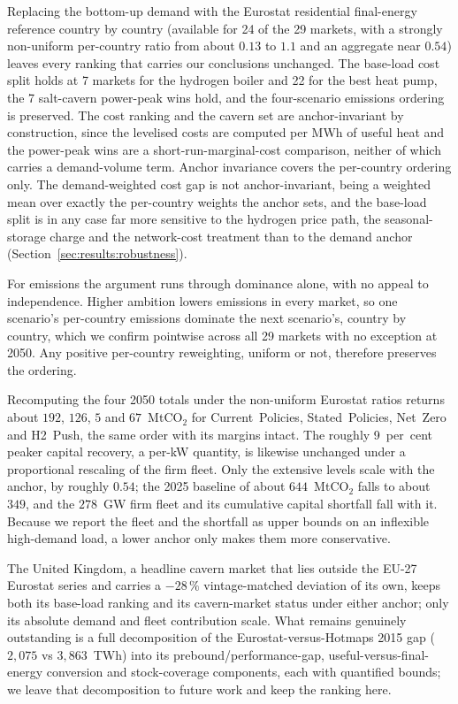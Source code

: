 Replacing the bottom-up demand with the Eurostat
residential final-energy reference country by country (available for 24 of the 29
markets, with a strongly non-uniform per-country ratio from about $0.13$ to $1.1$ and
an aggregate near $0.54$) leaves every ranking that carries our conclusions unchanged. The base-load cost split holds at 7 markets for the hydrogen boiler and 22 for the
best heat pump, the
7 salt-cavern power-peak wins hold, and the four-scenario emissions ordering is
preserved. The cost ranking and the cavern set are anchor-invariant by construction, since the levelised costs are computed per MWh of useful heat
and the power-peak wins are a short-run-marginal-cost comparison, neither of which
carries a demand-volume term. Anchor invariance covers the per-country ordering only.
The demand-weighted cost gap is not anchor-invariant, being a weighted mean over
exactly the per-country weights the anchor sets, and the base-load split is in any case
far more sensitive to the hydrogen price path, the seasonal-storage charge and the
network-cost treatment than to
the demand anchor (Section~\ref{sec:results:robustness}).

For emissions the argument runs through dominance alone, with no appeal to independence. Higher ambition lowers emissions in every market, so one scenario's per-country emissions dominate the next scenario's, country by country, which we
confirm pointwise across all 29 markets with no exception at 2050. Any positive
per-country reweighting, uniform or not, therefore preserves the ordering.

Recomputing the four 2050 totals under the non-uniform Eurostat ratios returns about
$192$, $126$, $5$ and $67$~MtCO$_2$ for Current~Policies, Stated~Policies, Net~Zero and H2~Push, the same
order with its margins intact. The roughly 9~per~cent peaker capital recovery, a per-kW quantity, is
likewise unchanged under a proportional rescaling of the firm fleet. Only the extensive
levels scale with the anchor, by roughly $0.54$; the 2025 baseline of about
$644$~MtCO$_2$ falls to about $349$, and the $278$~GW firm fleet and its cumulative
capital shortfall fall with it. Because we report the fleet and the shortfall as upper bounds on an
inflexible high-demand load, a lower anchor only makes them more conservative.

The United Kingdom, a headline cavern market that lies outside the EU-27 Eurostat series
and carries a $-28\,\%$ vintage-matched deviation of its own, keeps both its base-load
ranking and its cavern-market status under either anchor; only its absolute demand and
fleet contribution scale. What remains genuinely outstanding is a full decomposition
of the Eurostat-versus-Hotmaps 2015 gap ($2{,}075$ vs $3{,}863$~TWh) into its
prebound/performance-gap, useful-versus-final-energy conversion and stock-coverage
components, each with quantified bounds; we leave that decomposition to future work and keep the ranking here.

